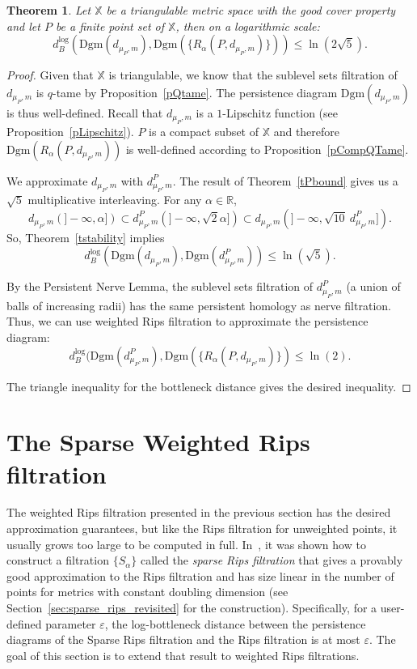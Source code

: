 \documentclass[a4paper]{article}
\newcommand\dmP{d_{\mu_P,m}}
\newcommand\dPP{d_{\mu_P,m}^P}
\newcommand\X{\mathbb{X}}
\newcommand\R{\mathbb{R}}
\newcommand\Dgm[1]{\mathrm{Dgm}(#1)}
\newcommand\dbl{d_B^{\mathrm{log}}}
\newtheorem{theorem}{Theorem}[section]
\newcommand{\e}{\varepsilon}
\begin{document}
\begin{theorem}\label{thm:approximating_dPP_with_weighted_rips}
Let $\X$ be a triangulable metric space with the good cover property and let $P$ be a finite point set of $\X$, then on a logarithmic scale:
$$\dbl(\Dgm{\dmP},\Dgm{\{R_\alpha(P,\dmP)\}})\leq \ln(2\sqrt{5}).$$
\end{theorem}

\begin{proof}
Given that $\X$ is triangulable, we know that the sublevel sets filtration of $\dmP$ is $q$-tame by Proposition~\ref{pQtame}.
The persistence diagram $\Dgm{\dmP}$ is thus well-defined.
Recall that $\dmP$ is a $1$-Lipschitz function (see Proposition~\ref{pLipschitz}).
$P$ is a compact subset of $\X$ and therefore $\Dgm{R_\alpha(P,\dmP)}$ is well-defined according to Proposition~\ref{pCompQTame}.

We approximate $\dmP$ with $\dPP$. 
The result of Theorem~\ref{tPbound} gives us a $\sqrt{5}$ multiplicative interleaving.
For any $\alpha\in\R$,
\[
  \dmP(]-\infty,\alpha])\subset\dPP(]-\infty,\sqrt{2}\alpha])\subset\dmP(]-\infty,\sqrt{10}\ \dPP]).
\]
So, Theorem~\ref{tstability} implies
\[
  \dbl(\Dgm{\dmP},\Dgm{\dPP})\leq\ln(\sqrt{5}).
\]

By the Persistent Nerve Lemma, the sublevel sets filtration of $\dPP$ (a union of balls of increasing radii) has the same persistent homology as nerve filtration.
Thus, we can use weighted Rips filtration to approximate the persistence diagram:
$$\dbl(\Dgm{\dPP},\Dgm{\{R_\alpha(P,\dmP)\}}\leq \ln(2).$$

The triangle inequality for the bottleneck distance gives the desired inequality.
\end{proof}







\section{The Sparse Weighted Rips filtration} \label{sec:sparse_rips}

The weighted Rips filtration presented in the previous section has the desired approximation guarantees, but like the Rips filtration for unweighted points, it usually grows too large to be computed in full.
In~\cite{lsavrfS}, it was shown how to construct a filtration $\{S_\alpha\}$ called the \emph{sparse Rips filtration} that gives a provably good approximation to the Rips filtration and has size linear in the number of points for metrics with constant doubling dimension (see Section~\ref{sec:sparse_rips_revisited} for the construction).
Specifically, for a user-defined parameter $\e$, the log-bottleneck distance between the persistence diagrams of the Sparse Rips filtration and the Rips filtration is at most $\e$.
The goal of this section is to extend that result to weighted Rips filtrations.
\end{document}
